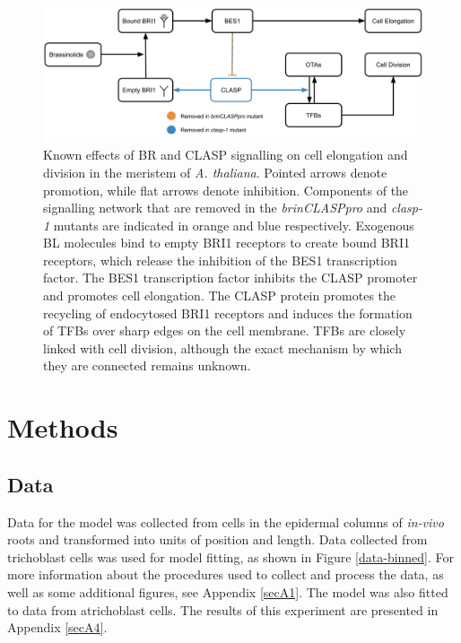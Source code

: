 \documentclass[referee,pdflatex,sn-mathphys-num]{sn-jnl}
\begin{document}
\begin{figure}
\centering
\includegraphics[width=\textwidth]{network-complete.png}
\caption{Known effects of BR and CLASP signalling on cell elongation and division in the meristem of \emph{A. thaliana}. Pointed arrows denote promotion, while flat arrows denote inhibition.
Components of the signalling network that are removed in the \emph{brinCLASPpro} and \emph{clasp-1} mutants are indicated in orange and blue respectively.
Exogenous BL molecules bind to empty BRI1 receptors to create bound BRI1 receptors, which release the inhibition of the BES1 transcription factor.
The BES1 transcription factor inhibits the CLASP promoter and promotes cell elongation.
The CLASP protein promotes the recycling of endocytosed BRI1 receptors and induces the formation of TFBs over sharp edges on the cell membrane.
TFBs are closely linked with cell division, although the exact mechanism by which they are connected remains unknown. }
\label{network}
\end{figure}

\section{Methods}\label{sec11}

\subsection{Data}

Data for the model was collected from cells in the epidermal columns of \emph{in-vivo} roots and transformed into units of position and length.
Data collected from trichoblast cells was used for model fitting, as shown in Figure \ref{data-binned}.
For more information about the procedures used to collect and process the data, as well as some additional figures, see Appendix \ref{secA1}.
The model was also fitted to data from atrichoblast cells.
The results of this experiment are presented in Appendix \ref{secA4}.
\end{document}
